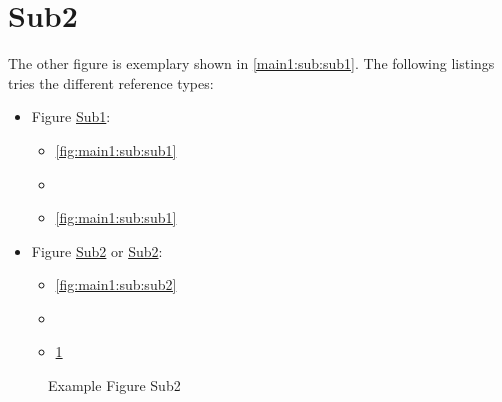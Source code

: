\section[Sub2]{Sub2}\label{main1:sub:sub2}

The other figure is exemplary shown in \autoref{main1:sub:sub1}. The following listings tries the different reference types:
\begin{itemize}
    \item Figure \hyperref[fig:main1:sub:sub1]{Sub1}:
        \begin{itemize}
            \item \autoref{fig:main1:sub:sub1}
            \item {}
            \item \ref{fig:main1:sub:sub1}
        \end{itemize}
    \item Figure \hyperref[fig:main1:sub:sub2]{Sub2} or \hyperref[{fig:main1:sub:sub2}]{Sub2}:
        \begin{itemize}
            \item \autoref{fig:main1:sub:sub2}
            \item {}
            \item \ref{fig:main1:sub:sub2}
        \end{itemize}
\end{itemize}


\begin{figure}[!h]
    \caption[{Main1; Sub; Sub2}]{Example Figure Sub2}
    \label{fig:main1:sub:sub2}
\end{figure}

